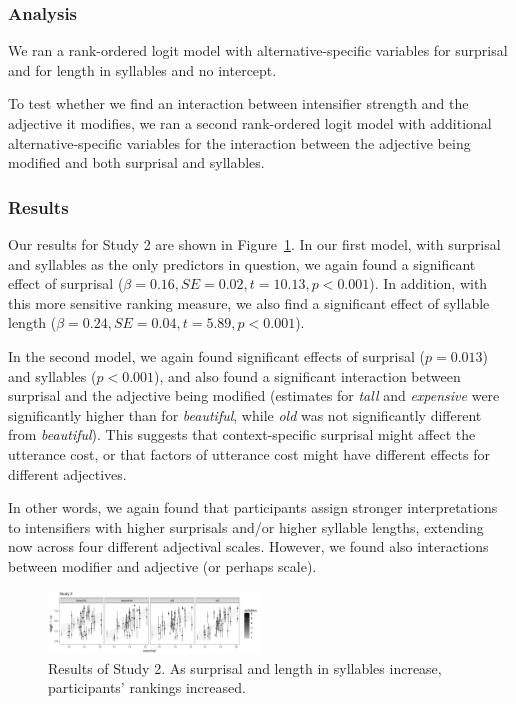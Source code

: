 \documentclass[10pt,letterpaper]{article}
\newcommand{\w}[1]{\emph{#1}}
\begin{document}
\subsubsection{Analysis}

We ran a rank-ordered logit model \cite{beggs_assessing_1981, hausman_specifying_1987} with alternative-specific variables for surprisal and for length in syllables and no intercept.

To test whether we find an interaction between intensifier strength and the adjective it modifies, we ran a second rank-ordered logit model with additional alternative-specific variables for the interaction between the adjective being modified and both surprisal and syllables. 

\subsubsection{Results}

Our results for Study 2 are shown in Figure~\ref{fig:plot_study2}. In our first model, with surprisal and syllables as the only predictors in question, we again found a significant effect of surprisal ($\beta=0.16, SE=0.02, t=10.13, p<0.001$). In addition, with this more sensitive ranking measure, we also find a significant effect of syllable length ($\beta=0.24, SE=0.04, t=5.89, p<0.001$).

In the second model, we again found significant effects of surprisal ($p=0.013$) and syllables ($p<0.001$), and also found a significant interaction between surprisal and the adjective being modified (estimates for \w{tall} and \w{expensive} were significantly higher than for \w{beautiful}, while \w{old} was not significantly different from \w{beautiful}).
This suggests that context-specific surprisal might affect the utterance cost, or that factors of utterance cost might have different effects for different adjectives.

In other words, we again found that participants assign stronger interpretations to intensifiers with higher surprisals and/or higher syllable lengths, extending now across four different adjectival scales. However, we found also interactions between modifier and adjective (or perhaps scale).

\begin{figure}[hbt]
\begin{center}
\includegraphics[width=0.5\textwidth]{images/plot_study2.pdf}
\end{center}
\caption{Results of Study 2. As surprisal and length in syllables increase, participants' rankings increased.} 
\label{fig:plot_study2}
\end{figure}
\end{document}
